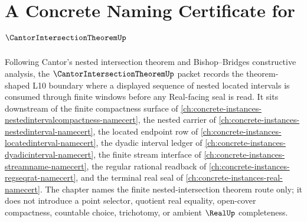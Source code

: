 \chapter{A Concrete Naming Certificate for $\CantorIntersectionTheoremUp$}
\label{ch:concrete-instances-cantor-intersection-theorem-namecert}

Following Cantor's nested intersection theorem and Bishop--Bridges constructive analysis, the $\CantorIntersectionTheoremUp$ packet records the theorem-shaped L10 boundary where a displayed sequence of nested located intervals is consumed through finite windows before any Real-facing seal is read. It sits downstream of the finite compactness surface of \autoref{ch:concrete-instances-nestedintervalcompactness-namecert}, the nested carrier of \autoref{ch:concrete-instances-nestedinterval-namecert}, the located endpoint row of \autoref{ch:concrete-instances-locatedinterval-namecert}, the dyadic interval ledger of \autoref{ch:concrete-instances-dyadicinterval-namecert}, the finite stream interface of \autoref{ch:concrete-instances-streamname-namecert}, the regular rational readback of \autoref{ch:concrete-instances-regseqrat-namecert}, and the terminal real seal of \autoref{ch:concrete-instances-real-namecert}. The chapter names the finite nested-intersection theorem route only; it does not introduce a point selector, quotient real equality, open-cover compactness, countable choice, trichotomy, or ambient $\RealUp$ completeness.

